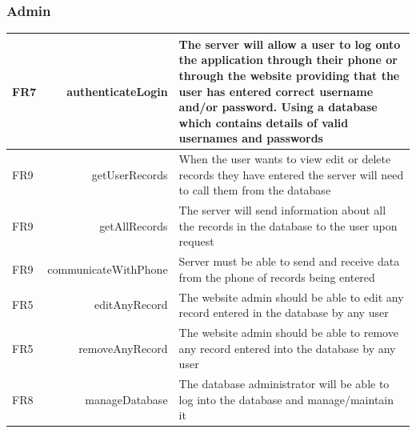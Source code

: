 	\subsubsection{Admin}
	\begin{tabular}{| l  r | p{10cm} |}
		\hline
		FR7 & authenticateLogin  & The server will allow a user to log onto the application through their phone or through the website providing that the user has entered correct username and/or password. Using a database which contains details of valid usernames and passwords \\ \hline
		FR9 & getUserRecords  & When the user wants to view edit or delete records they have entered the server will need to call them from the database \\ \hline
		FR9 & getAllRecords  & The server will send information about all the records in the database to the user upon request \\ \hline
		FR9 & communicateWithPhone  & Server must be able to send and receive data from the phone of records being entered \\ \hline
		FR5 & editAnyRecord  & The website admin should be able to edit any record entered in the database by any user \\ \hline
		FR5 & removeAnyRecord  & The website admin should be able to remove any record entered into the database by any user \\ \hline
		FR8 & manageDatabase  & The database administrator will be able to log into the database and manage/maintain it \\ \hline
	\end{tabular}